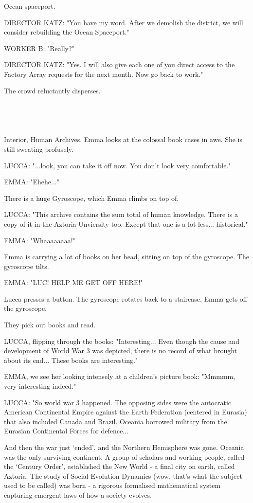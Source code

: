 \documentclass[11pt]{article}
\begin{document}
Ocean spaceport.

DIRECTOR KATZ: "You have my word.
After we demolish the district, we will consider rebuilding the Ocean Spaceport."

WORKER B: "Really?"

DIRECTOR KATZ: "Yes. 
I will also give each one of you direct access to the Factory Array requests for the next month. 
Now go back to work."

The crowd reluctantly disperses.

\ 

\ 

Interior, Human Archives.
Emma looks at the colossal book cases in awe.
She is still sweating profusely.

LUCCA: "...look, you can take it off now. 
You don't look very comfortable."

EMMA: "Ehehe..."

There is a huge Gyroscope, which Emma climbs on top of.

LUCCA: "This archive contains the sum total of human knowledge. 
There is a copy of it in the Aztoria Unviersity too.
Except that one is a lot less... historical."

EMMA: "Whaaaaaaaa!"

Emma is carrying a lot of books on her head, sitting on top of the gyroscope. The gyroscope tilts.

EMMA: "LUC! HELP ME GET OFF HERE!"

Lucca presses a button. The gyroscope rotates back to a staircase. 
Emma gets off the gyroscope.

They pick out books and read.

LUCCA, flipping through the books: "Interesting...
Even though the cause and development of World War 3 was depicted, there is no record of what brought about its end...
These books are interesting."

EMMA, we see her looking intensely at a children's picture book: "Mmmmm, very interesting indeed."

LUCCA: "So world war 3 happened. 
The opposing sides were the autocratic American Continental Empire against the Earth Federation (centered in Eurasia) that also included Canada and Brazil.
Oceania borrowed military from the Eurasian Continental Forces for defence...

And then the war just `ended', and the Northern Hemisphere was gone.
Oceania was the only surviving continent.
A group of scholars and working people, called the `Century Order', established the New World - a final city on earth, called Aztoria.
The study of Social Evolution Dynamics (wow, that's what the subject used to be called) was born - a rigorous formalised mathematical system capturing emergent laws of how a society evolves.
\end{document}

